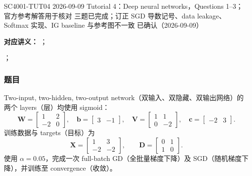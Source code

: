 
\label{tutorial:SC4001-TUT04}

\tutorialmeta
  {SC4001-TUT04}
  {2026-09-09}
  {Tutorial 4：Deep neural networks，Questions 1--3；官方参考解答用于核对}
  {三题已完成；订正 SGD 导数记号、data leakage、Softmax 实现、IG baseline 与参考图不一致}
  {已确认（2026-09-09）}


\textbf{对应讲义：}
；\par\noindent
{}；\par\noindent
{}

\subsubsection*{题目}

Two-input, two-hidden, two-output network（双输入、双隐藏、双输出网络）的两个 layers（层）均使用 sigmoid：
\[
  \bm W=\begin{bmatrix}1&2\\-2&0\end{bmatrix},\quad
  \bm b=\begin{bmatrix}3&-1\end{bmatrix},\quad
  \bm V=\begin{bmatrix}1&1\\0&-2\end{bmatrix},\quad
  \bm c=\begin{bmatrix}-2&3\end{bmatrix}.
\]
训练数据与 targets（目标）为
\[
  \bm X=\begin{bmatrix}1&3\\-2&-2\end{bmatrix},\qquad
  \bm D=\begin{bmatrix}0&1\\1&0\end{bmatrix}.
\]
使用 $\alpha=0.05$，完成一次 full-batch GD（全批量梯度下降）及 SGD（随机梯度下降），并训练至 convergence（收敛）。

